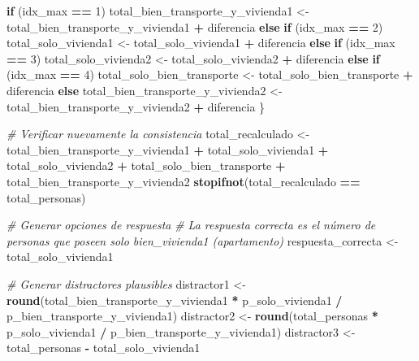\documentclass[
]{article}
\newenvironment{Shaded}{\begin{snugshade}}{\end{snugshade}}
\newcommand{\CommentTok}[1]{\textcolor[rgb]{0.56,0.35,0.01}{\textit{#1}}}
\newcommand{\ControlFlowTok}[1]{\textcolor[rgb]{0.13,0.29,0.53}{\textbf{#1}}}
\newcommand{\DecValTok}[1]{\textcolor[rgb]{0.00,0.00,0.81}{#1}}
\newcommand{\FunctionTok}[1]{\textcolor[rgb]{0.13,0.29,0.53}{\textbf{#1}}}
\newcommand{\NormalTok}[1]{#1}
\newcommand{\OtherTok}[1]{\textcolor[rgb]{0.56,0.35,0.01}{#1}}
\newcommand{\SpecialCharTok}[1]{\textcolor[rgb]{0.81,0.36,0.00}{\textbf{#1}}}
\begin{document}
\begin{Shaded}
\begin{Highlighting}[]
  \ControlFlowTok{if}\NormalTok{ (idx\_max }\SpecialCharTok{==} \DecValTok{1}\NormalTok{) total\_bien\_transporte\_y\_vivienda1 }\OtherTok{\textless{}{-}}\NormalTok{ total\_bien\_transporte\_y\_vivienda1 }\SpecialCharTok{+}\NormalTok{ diferencia}
  \ControlFlowTok{else} \ControlFlowTok{if}\NormalTok{ (idx\_max }\SpecialCharTok{==} \DecValTok{2}\NormalTok{) total\_solo\_vivienda1 }\OtherTok{\textless{}{-}}\NormalTok{ total\_solo\_vivienda1 }\SpecialCharTok{+}\NormalTok{ diferencia}
  \ControlFlowTok{else} \ControlFlowTok{if}\NormalTok{ (idx\_max }\SpecialCharTok{==} \DecValTok{3}\NormalTok{) total\_solo\_vivienda2 }\OtherTok{\textless{}{-}}\NormalTok{ total\_solo\_vivienda2 }\SpecialCharTok{+}\NormalTok{ diferencia}
  \ControlFlowTok{else} \ControlFlowTok{if}\NormalTok{ (idx\_max }\SpecialCharTok{==} \DecValTok{4}\NormalTok{) total\_solo\_bien\_transporte }\OtherTok{\textless{}{-}}\NormalTok{ total\_solo\_bien\_transporte }\SpecialCharTok{+}\NormalTok{ diferencia}
  \ControlFlowTok{else}\NormalTok{ total\_bien\_transporte\_y\_vivienda2 }\OtherTok{\textless{}{-}}\NormalTok{ total\_bien\_transporte\_y\_vivienda2 }\SpecialCharTok{+}\NormalTok{ diferencia}
\NormalTok{\}}

\CommentTok{\# Verificar nuevamente la consistencia}
\NormalTok{total\_recalculado }\OtherTok{\textless{}{-}}\NormalTok{ total\_bien\_transporte\_y\_vivienda1 }\SpecialCharTok{+}\NormalTok{ total\_solo\_vivienda1 }\SpecialCharTok{+}\NormalTok{ total\_solo\_vivienda2 }\SpecialCharTok{+}
\NormalTok{                    total\_solo\_bien\_transporte }\SpecialCharTok{+}\NormalTok{ total\_bien\_transporte\_y\_vivienda2}
\FunctionTok{stopifnot}\NormalTok{(total\_recalculado }\SpecialCharTok{==}\NormalTok{ total\_personas)}

\CommentTok{\# Generar opciones de respuesta}
\CommentTok{\# La respuesta correcta es el número de personas que poseen solo bien\_vivienda1 (apartamento)}
\NormalTok{respuesta\_correcta }\OtherTok{\textless{}{-}}\NormalTok{ total\_solo\_vivienda1}

\CommentTok{\# Generar distractores plausibles}
\NormalTok{distractor1 }\OtherTok{\textless{}{-}} \FunctionTok{round}\NormalTok{(total\_bien\_transporte\_y\_vivienda1 }\SpecialCharTok{*}\NormalTok{ p\_solo\_vivienda1 }\SpecialCharTok{/}\NormalTok{ p\_bien\_transporte\_y\_vivienda1)}
\NormalTok{distractor2 }\OtherTok{\textless{}{-}} \FunctionTok{round}\NormalTok{(total\_personas }\SpecialCharTok{*}\NormalTok{ p\_solo\_vivienda1 }\SpecialCharTok{/}\NormalTok{ p\_bien\_transporte\_y\_vivienda1)}
\NormalTok{distractor3 }\OtherTok{\textless{}{-}}\NormalTok{ total\_personas }\SpecialCharTok{{-}}\NormalTok{ total\_solo\_vivienda1}


\end{Highlighting}
\end{Shaded}
\end{document}
